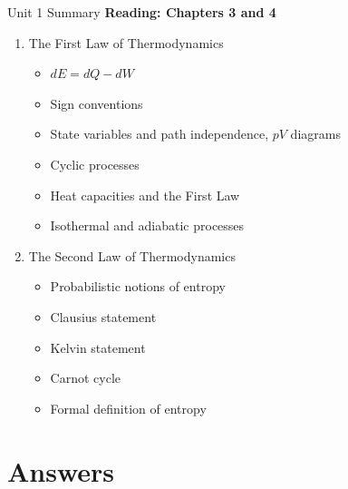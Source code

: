 \documentclass{beamer}
\begin{document}
\begin{frame}{Unit 1 Summary}
\textbf{Reading: Chapters 3 and 4}
\begin{enumerate}
\item The First Law of Thermodynamics
\begin{itemize}
\item $dE = dQ - dW$
\item Sign conventions
\item State variables and path independence, $pV$ diagrams
\item Cyclic processes
\item Heat capacities and the First Law
\item Isothermal and adiabatic processes
\end{itemize}
\item The Second Law of Thermodynamics
\begin{itemize}
\item Probabilistic notions of entropy
\item Clausius statement
\item Kelvin statement
\item Carnot cycle
\item Formal definition of entropy
\end{itemize}
\end{enumerate}
\end{frame}

\section{Answers}
\end{document}
